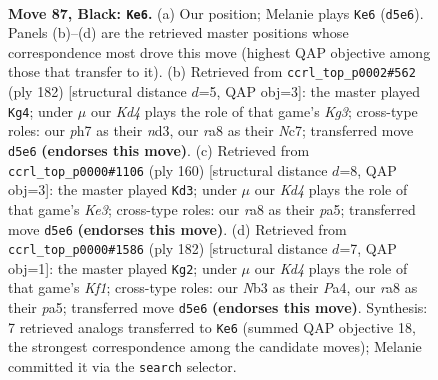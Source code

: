 \documentclass[11pt]{article}
\begin{document}
\clearpage

\begin{figure}[p]\centering
\begin{subfigure}{0.46\textwidth}\centering
\resizebox{\linewidth}{!}{%
\newchessgame
\chessboard[
  setfen={R7/7P/6p1/3k1p2/5P2/1n6/6K1/8 b - - 8 87},
  showmover=false,
  pgfstyle=straightmove, color=movearrow, markmove={d5-e6}
]}
\caption{}
\end{subfigure}\hfill
\begin{subfigure}{0.46\textwidth}\centering
\resizebox{\linewidth}{!}{%
\newchessgame
\chessboard[
  setfen={8/2N5/5p1k/5P2/4P3/3n2K1/8/8 w - - 37 92},
  showmover=false,
  pgfstyle=straightmove, color=movearrow, markmove={g3-g4}
]}
\caption{}
\end{subfigure}
\\[4pt]
\begin{subfigure}{0.46\textwidth}\centering
\resizebox{\linewidth}{!}{%
\newchessgame
\chessboard[
  setfen={8/8/8/p1p1k3/2P5/1P2K3/8/8 w - - 13 81},
  showmover=false,
  pgfstyle=straightmove, color=movearrow, markmove={e3-d3}
]}
\caption{}
\end{subfigure}\hfill
\begin{subfigure}{0.46\textwidth}\centering
\resizebox{\linewidth}{!}{%
\newchessgame
\chessboard[
  setfen={8/7k/5P2/p4pP1/P6p/8/8/5K2 w - - 0 92},
  showmover=false,
  pgfstyle=straightmove, color=movearrow, markmove={f1-g2}
]}
\caption{}
\end{subfigure}
\caption{\textbf{Move 87, Black: \texttt{Ke6}.} (a) Our position; Melanie plays \texttt{Ke6} (\texttt{d5e6}). Panels (b)--(d) are the retrieved master positions whose correspondence most drove this move (highest QAP objective among those that transfer to it). (b) Retrieved from \texttt{ccrl\_top\_p0002\#562} (ply 182) [structural distance $d$=5, QAP obj=3]: the master played \texttt{Kg4}; under $\mu$ our \emph{Kd4} plays the role of that game's \emph{Kg3}; cross-type roles: our \emph{p}h7 as their \emph{n}d3, our \emph{r}a8 as their \emph{N}c7; transferred move \texttt{d5e6} \textbf{(endorses this move)}. (c) Retrieved from \texttt{ccrl\_top\_p0000\#1106} (ply 160) [structural distance $d$=8, QAP obj=3]: the master played \texttt{Kd3}; under $\mu$ our \emph{Kd4} plays the role of that game's \emph{Ke3}; cross-type roles: our \emph{r}a8 as their \emph{p}a5; transferred move \texttt{d5e6} \textbf{(endorses this move)}. (d) Retrieved from \texttt{ccrl\_top\_p0000\#1586} (ply 182) [structural distance $d$=7, QAP obj=1]: the master played \texttt{Kg2}; under $\mu$ our \emph{Kd4} plays the role of that game's \emph{Kf1}; cross-type roles: our \emph{N}b3 as their \emph{P}a4, our \emph{r}a8 as their \emph{p}a5; transferred move \texttt{d5e6} \textbf{(endorses this move)}. Synthesis: 7 retrieved analogs transferred to \texttt{Ke6} (summed QAP objective 18, the strongest correspondence among the candidate moves); Melanie committed it via the \texttt{search} selector.}
\label{fig:thought-m173}
\end{figure}
\end{document}

